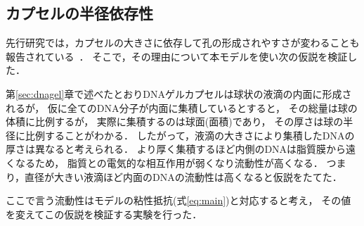 \subsection{カプセルの半径依存性}
先行研究では，カプセルの大きさに依存して孔の形成されやすさが変わることも報告されている~\cite{morita2017formation}．
そこで，その理由について本モデルを使い次の仮説を検証した．

第\ref{sec:dnagel}章で述べたとおりDNAゲルカプセルは球状の液滴の内面に形成されるが，
仮に全てのDNA分子が内面に集積しているとすると，
その総量は球の体積に比例するが，
実際に集積するのは球面(面積)であり，
その厚さは球の半径に比例することがわかる．
したがって，液滴の大きさにより集積したDNAの厚さは異なると考えられる．
より厚く集積するほど内側のDNAは脂質膜から遠くなるため，
脂質との電気的な相互作用が弱くなり流動性が高くなる．
つまり，直径が大きい液滴ほど内面のDNAの流動性は高くなると仮説をたてた．

ここで言う流動性はモデルの粘性抵抗(式\ref{eq:main})と対応すると考え，
その値を変えてこの仮説を検証する実験を行った．

